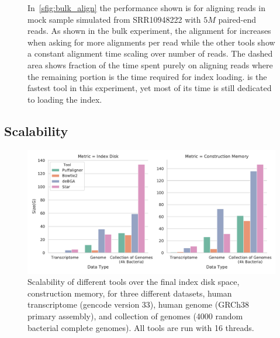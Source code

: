 \begin{figure}[H]
{    In~\ref{sfig:bulk_align} the performance shown is for aligning reads
    in mock sample simulated from SRR10948222 with $5M$ paired-end reads.
    As shown in the bulk experiment, the alignment for \bt
    increases when asking for more alignments per read while the other tools show a
    constant alignment time scaling over number of reads. The dashed area
    shows fraction of the time spent purely on aligning reads where the
    remaining portion is the time required for index loading. \puffaligner is 
    the fastest tool in this experiment, yet most of its time is still dedicated
    to loading the index.}
    \label{fig:alignment_performance}
    \vspace{-0.2in}
\end{figure}



\subsection{Scalability}
\begin{figure}[h!]
    \centering
    \includegraphics[width=0.8\columnwidth,type=pdf,ext=.pdf,read=.pdf]
    {Figures/puff/indexSizeScale}
    \caption[scalability of different aligners - memory]
    {Scalability of different tools over the final index disk space, construction 
    memory, for three different datasets, human transcriptome (gencode version 33), 
    human genome (GRCh38 primary assembly), and collection of genomes (4000
    random bacterial complete genomes). All tools are run with 16 threads.}
    \label{sfig:size}
\end{figure}
